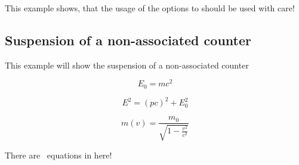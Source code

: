 \documentclass[12pt,paper=a4]{ltxdoc}
\begin{document}
This example shows, that the usage of the options to  should be used with care!


\subsection{Suspension of a non-associated counter}
This example will show the suspension of a non-associated counter


\begin{dispExample}
\setcounter{equation}{0}%
%
\begin{equation}
E_{0} = mc^2
\end{equation}

\begin{equation}
E^2 = \left({ pc}\right)^2 + E^{2}_{0}
\end{equation}

\begin{equation}
  m(v) = \frac{m_{0}}{\sqrt{1-\frac{v^2}{c^2}}} 
\end{equation}


There are \number\value{equation}~equations in here!
\end{dispExample}


\clearpage


\printindex
\end{document}
